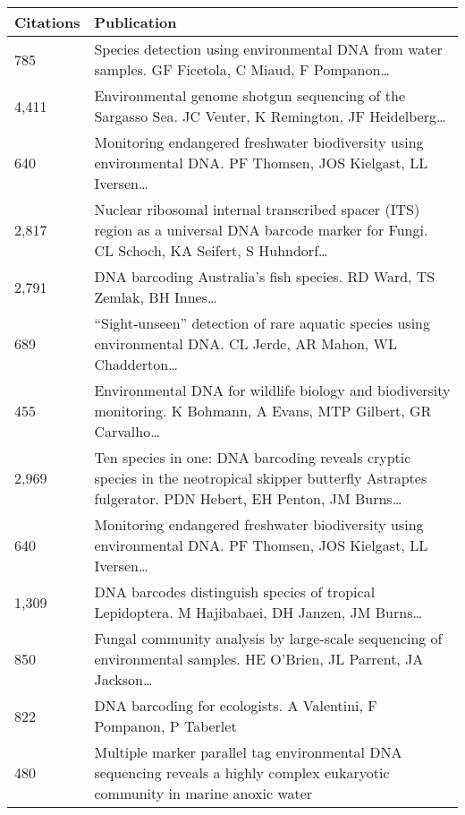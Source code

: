\documentclass{beamer}
\begin{document}
\begin{frame}
\begin{table}[h]
	\centering
	\begin{tabular}{p{2cm} p{11cm}}
		\toprule
		{\textbf{Citations}} & {\textbf{Publication}} \\
		\midrule
		{785} & {Species detection using environmental DNA from water samples. GF Ficetola, C Miaud, F Pompanon…} \\ \midrule
		{4,411} & {Environmental genome shotgun sequencing of the Sargasso Sea. 
		JC Venter, K Remington, JF Heidelberg…}\\ \midrule
		{640} & {Monitoring endangered freshwater biodiversity using environmental DNA. 
		PF Thomsen, JOS Kielgast, LL Iversen…}\\ \midrule
		{2,817} & {Nuclear ribosomal internal transcribed spacer (ITS) region as a universal DNA barcode marker for Fungi. CL Schoch, KA Seifert, S Huhndorf…}\\ \midrule
		{2,791} & {DNA barcoding Australia's fish species. RD Ward, TS Zemlak, BH Innes…} \\ \midrule
		{689} & {``Sight‐unseen'' detection of rare aquatic species using environmental DNA. 
		CL Jerde, AR Mahon, WL Chadderton…}\\ \midrule
		{455} & {Environmental DNA for wildlife biology and biodiversity monitoring. K Bohmann, 
		A Evans, MTP Gilbert, GR Carvalho…}\\
		\midrule
		{2,969} & {Ten species in one: DNA barcoding reveals cryptic species in the neotropical skipper 
		butterfly Astraptes fulgerator. PDN Hebert, EH Penton, JM Burns…}\\ \midrule
		{640} & {Monitoring endangered freshwater biodiversity using environmental DNA. 
		PF Thomsen, JOS Kielgast, LL Iversen…}\\ \midrule
		{1,309} & {DNA barcodes distinguish species of tropical Lepidoptera. 
		M Hajibabaei, DH Janzen, JM Burns…} \\ \midrule
		{850} & {Fungal community analysis by large-scale sequencing of environmental 
		samples. HE O'Brien, JL Parrent, JA Jackson…}\\ \midrule
		{822} & {DNA barcoding for ecologists. A Valentini, F Pompanon, P Taberlet}\\ \midrule
		{480} & {Multiple marker parallel tag environmental DNA sequencing reveals a highly complex eukaryotic community in marine anoxic water}\\
		\bottomrule
	\end{tabular}
\end{table}
\end{frame}
\end{document}
